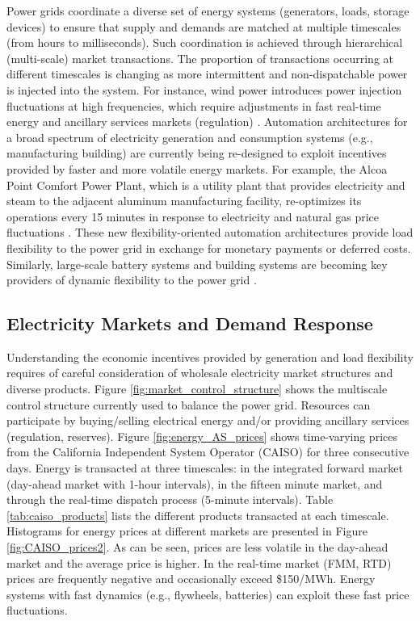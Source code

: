 \documentclass[11pt,twoside]{article}
\begin{document}
Power grids coordinate a diverse set of energy systems (generators, loads, storage devices) to ensure that supply and demands are matched at multiple timescales (from hours to milliseconds). Such coordination is achieved through hierarchical (multi-scale) market transactions. The proportion of transactions occurring at different timescales is changing as more intermittent and non-dispatchable power is injected into the system.  For instance, wind power introduces power injection fluctuations at high frequencies, which require adjustments in fast real-time energy and ancillary services markets (regulation)  \cite{banakar2008impacts}.  Automation architectures for a broad spectrum of electricity generation and consumption systems (e.g., manufacturing building)  are currently being re-designed to exploit incentives provided by faster and more volatile energy markets. For example, the Alcoa Point Comfort Power Plant, which is a utility plant that provides electricity and steam to the adjacent aluminum manufacturing facility, re-optimizes its operations every 15 minutes in response to electricity and natural gas price fluctuations  \cite{Valadez2008}. These new flexibility-oriented automation architectures provide load flexibility to the power grid in exchange for monetary payments or deferred costs. Similarly, large-scale battery systems and building systems are becoming key providers of dynamic flexibility to the power grid \cite{Hao2012,Fares2014}. 

\subsection{Electricity Markets and Demand Response}

Understanding the economic incentives provided by generation and load flexibility requires of careful consideration of wholesale electricity market structures and diverse products. Figure \ref{fig:market_control_structure} shows the multiscale control structure currently used to balance the power grid. Resources can participate by buying/selling electrical energy and/or providing ancillary services (regulation, reserves). Figure \ref{fig:energy_AS_prices} shows time-varying prices from the California Independent System Operator (CAISO) for three consecutive days. Energy is transacted at three timescales: in the integrated forward market (day-ahead market with 1-hour intervals), in the fifteen minute market, and through the real-time dispatch process (5-minute intervals). Table \ref{tab:caiso_products} lists the different products transacted at each timescale. Histograms for energy prices at different markets are presented in Figure \ref{fig:CAISO_prices2}. As can be seen, prices are less volatile in the day-ahead market and the average price is higher. In the real-time market (FMM, RTD) prices are frequently negative and occasionally exceed \$150/MWh. Energy systems with fast dynamics (e.g., flywheels, batteries) can exploit these fast price fluctuations.
\end{document}
